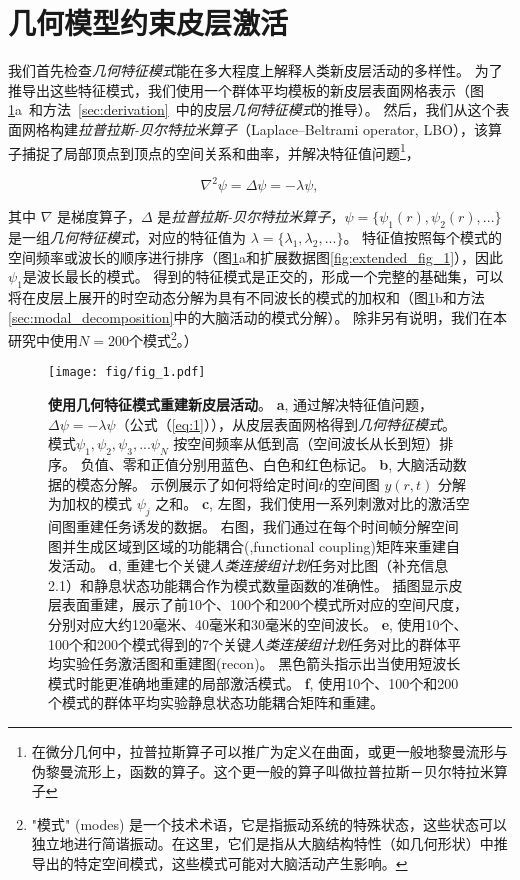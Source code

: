 \documentclass[lang=cn,a4paper,newtx]{elegantpaper}
\begin{document}
\section{几何模型约束皮层激活}
我们首先检查\textit{几何特征模式}能在多大程度上解释人类新皮层活动的多样性。
为了推导出这些特征模式，我们使用一个群体平均模板的新皮层表面网格表示（图\ref{fig:1}a~和方法~\ref{sec:derivation}~中的皮层\textit{几何特征模式}的推导）。
然后，我们从这个表面网格构建\textit{拉普拉斯-贝尔特拉米算子}（Laplace–Beltrami operator, LBO），该算子捕捉了局部顶点到顶点的空间关系和曲率，并解决特征值问题\footnote{在微分几何中，拉普拉斯算子可以推广为定义在曲面，或更一般地黎曼流形与伪黎曼流形上，函数的算子。这个更一般的算子叫做拉普拉斯－贝尔特拉米算子}，

\begin{equation} \label{eq:1}
	\nabla^2 \psi = \Delta\psi = -\lambda \psi,
\end{equation}


其中 $ \nabla $ 是梯度算子，$ \Delta $ 是\textit{拉普拉斯-贝尔特拉米算子}，$ \psi = \{\psi_1(r), \psi_2(r),...\} $ 是一组\textit{几何特征模式}，对应的特征值为 $ \lambda = \{ \lambda_1, \lambda_2, ... \} $。
特征值按照每个模式的空间频率或波长的顺序进行排序（图\ref{fig:1}a和扩展数据图\ref{fig:extended_fig_1}），因此$ \psi_1 $是波长最长的模式。
得到的特征模式是正交的，形成一个完整的基础集，可以将在皮层上展开的时空动态分解为具有不同波长的模式的加权和（图\ref{fig:1}b和方法\ref{sec:modal_decomposition}中的大脑活动的模式分解）。
除非另有说明，我们在本研究中使用$ N = 200 $个模式\footnote{"模式" (modes) 是一个技术术语，它是指振动系统的特殊状态，这些状态可以独立地进行简谐振动。在这里，它们是指从大脑结构特性（如几何形状）中推导出的特定空间模式，这些模式可能对大脑活动产生影响。}。）


\begin{figure}[!htb]
	\centering
	\texttt{[image: fig/fig\_1.pdf]}
	\caption{\textbf{使用几何特征模式重建新皮层活动}。
	\textbf{a}, 通过解决特征值问题，$ \Delta \psi = -\lambda \psi $（公式（\ref{eq:1}）），从皮层表面网格得到\textit{几何特征模式}。
	模式$ \psi_1, \psi_2, \psi_3, ... \psi_N $ 按空间频率从低到高（空间波长从长到短）排序。
	负值、零和正值分别用蓝色、白色和红色标记。
	\textbf{b}, 大脑活动数据的模态分解。
	示例展示了如何将给定时间$ t $的空间图 $ y(r,t) $ 分解为加权的模式 $ \psi_j $ 之和。
	\textbf{c}, 左图，我们使用一系列刺激对比的激活空间图重建任务诱发的数据。
	右图，我们通过在每个时间帧分解空间图并生成区域到区域的功能耦合(,functional coupling)矩阵来重建自发活动。
	\textbf{d}, 重建七个关键\textit{人类连接组计划}任务对比图（补充信息2.1）和静息状态功能耦合作为模式数量函数的准确性。
	插图显示皮层表面重建，展示了前10个、100个和200个模式所对应的空间尺度，分别对应大约120毫米、40毫米和30毫米的空间波长。
	 \textbf{e}, 使用10个、100个和200个模式得到的7个关键\textit{人类连接组计划}任务对比的群体平均实验任务激活图和重建图(recon)。
	 黑色箭头指示出当使用短波长模式时能更准确地重建的局部激活模式。 
	 \textbf{f}, 使用10个、100个和200个模式的群体平均实验静息状态功能耦合矩阵和重建。
	} \label{fig:1}
\end{figure}
\end{document}
